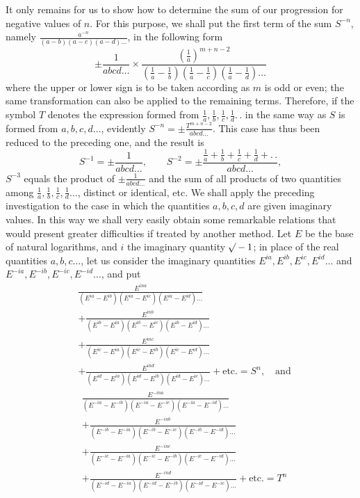 It only remains for us to show how to determine the sum of our progression for negative values of $n$. For this purpose, we shall put the first term of the sum $S^{-n}$, namely $\frac{a^{-n}}{(a-b)(a-c)(a-d)\ldots}$, in the following form
\[
\pm\frac1{abcd\ldots}\times\frac{(\frac1a)^{m+n-2}}{(\frac1a-\frac1b)(\frac1a-\frac1c)(\frac1a-\frac1d)\ldots}
\]
where the upper or lower sign is to be taken according as $m$ is odd or even; the same transformation can also be applied to the remaining terms. Therefore, if the symbol $T$ denotes the expression formed from $\frac1a,\frac1b,\frac1c,\frac1d.\,.$ in the same way as $S$ is formed from $a,b,c,d\ldots$, evidently $S^{-n}=\pm\frac{T^{m+n-2}}{abcd\ldots}$. This case has thus been reduced to the preceding one, and the result is
\[
S^{-1}=\pm\frac1{abcd\ldots},\qquad S^{-2}=\pm\frac{\frac1a+\frac1b+\frac1c+\frac1d+.\,.}{abcd\ldots},
\]
$S^{-3}$ equals the product of $\pm\frac1{abcd\ldots}$ and the sum of all products of two quantities among $\frac1a,\frac1b,\frac1c,\frac1d\ldots$, distinct or identical, etc.
We shall apply the preceding investigation to the case in which the quantities $a,b,c,d$ are given imaginary values. In this way we shall very easily obtain some remarkable relations that would present greater difficulties if treated by another method. Let $E$ be the base of natural logarithms, and $i$ the imaginary quantity $\mathord{{}^{}\!\surd}-1$; in place of the real quantities $a,b,c\ldots$, let us consider the imaginary quantities $E^{ia},E^{ib},E^{ic},E^{id}\ldots$ and $E^{-ia},E^{-ib},E^{-ic},E^{-id}\ldots$, and put
\[
\begin{aligned}
&\frac{E^{ina}}{(E^{ia}-E^{ib})(E^{ia}-E^{ic})(E^{ia}-E^{id})\ldots}\\
&+\frac{E^{inb}}{(E^{ib}-E^{ia})(E^{ib}-E^{ic})(E^{ib}-E^{id})\ldots}\\
&+\frac{E^{inc}}{(E^{ic}-E^{ia})(E^{ic}-E^{ib})(E^{ic}-E^{id})\ldots}\\
&+\frac{E^{ind}}{(E^{id}-E^{ia})(E^{id}-E^{ib})(E^{id}-E^{ic})\ldots}+\text{etc.}=S^n,\quad\text{and}
\end{aligned}
\]
\[
\begin{aligned}
&\frac{E^{-ina}}{(E^{-ia}-E^{-ib})(E^{-ia}-E^{-ic})(E^{-ia}-E^{-id})\ldots}\\
&+\frac{E^{-inb}}{(E^{-ib}-E^{-ia})(E^{-ib}-E^{-ic})(E^{-ib}-E^{-id})\ldots}\\
&+\frac{E^{-inc}}{(E^{-ic}-E^{-ia})(E^{-ic}-E^{-ib})(E^{-ic}-E^{-id})\ldots}\\
&+\frac{E^{-ind}}{(E^{-id}-E^{-ia})(E^{-id}-E^{-ib})(E^{-id}-E^{-ic})\ldots}+\text{etc.}=T^n
\end{aligned}
\]
